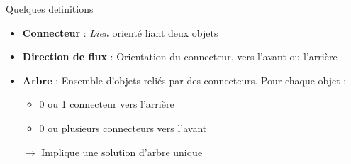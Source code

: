 \documentclass[8pt]{beamer}
\begin{document}
\begin{frame}
\begin{block}{Quelques definitions}
\begin{itemize}
        \item \textbf{Connecteur} : \textit{Lien} orienté liant deux objets
        \item \textbf{Direction de flux} : Orientation du connecteur, vers l'avant ou l'arrière
        \item \textbf{Arbre} : Ensemble d'objets reliés par des connecteurs. Pour chaque objet :
        \begin{itemize}
          \item 0 ou 1 connecteur vers l'arrière
          \item 0 ou plusieurs connecteurs vers l'avant
        \end{itemize}
        $\rightarrow$ Implique une solution d'arbre unique
      \end{itemize}
    \end{block}
  \end{frame}
  
\end{document}
